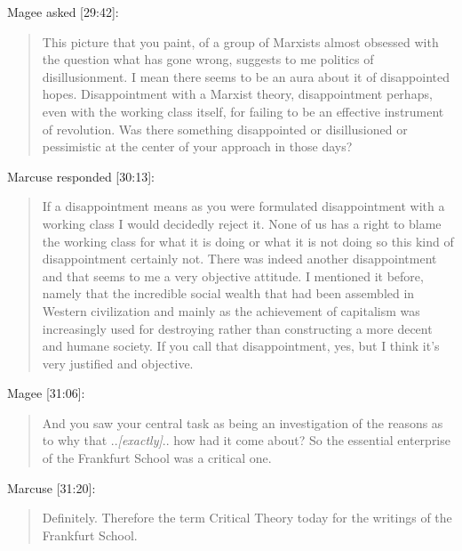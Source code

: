\documentclass[10pt,titlepage]{book}
\newcommand{\ignore}[1]{}
\begin{document}
Magee asked [29:42]:

\begin{quotation}
This picture that you paint, of a group of Marxists almost obsessed
with the question what has gone wrong, suggests to me politics of
disillusionment.
I mean there seems to be an aura about it of disappointed hopes.
Disappointment with a Marxist theory, disappointment perhaps,
even with the working class itself, for failing to be
an effective instrument of revolution.
Was there something disappointed or disillusioned or pessimistic at the
center of your approach in those days?
\end{quotation}

Marcuse responded [30:13]:

\begin{quotation}
If a disappointment means as you were
formulated disappointment with a working
class I would decidedly reject it.
None of us has a right to blame the working
class for what it is doing or what it is
not doing so this kind of disappointment
certainly not.
There was indeed another disappointment
and that seems to me a very objective attitude.
I mentioned it before, namely that the incredible
social wealth that had been assembled in
Western civilization and mainly as the
achievement of capitalism was
increasingly used for destroying rather
than constructing a more decent and
humane society.
If you call that disappointment, yes, but I think it's
very justified and objective.
\end{quotation}

Magee [31:06]:

\begin{quotation}
And you saw your central task as being an
investigation of the reasons as to why
that ..\emph{[exactly]}..
how had it come about?
So the essential enterprise of the Frankfurt School was a critical one.
\end{quotation}

Marcuse [31:20]:

\begin{quotation}
Definitely.
Therefore the term Critical Theory today for the writings of the Frankfurt School.
\end{quotation}

\ignore{
Magee [31:28]:
  \begin{quotation}
One thing that the members of the
Frankfurt School exhibited very
considerable concern with from the
beginning was the aesthetics, and this I
think differentiates it from most other
philosophies certainly from most other
political philosophies.
\end{quotation}
}%
\end{document}
